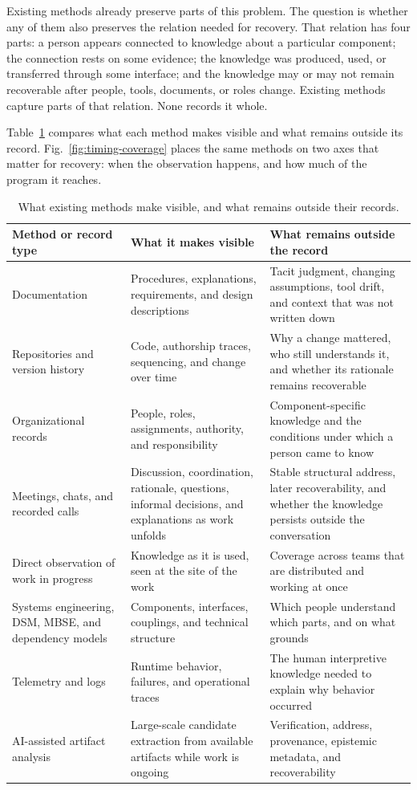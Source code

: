\documentclass[conference]{IEEEtran}
\begin{document}
Existing methods already preserve parts of this problem. The question is whether any of them also preserves the relation needed for recovery. That relation has four parts: a person appears connected to knowledge about a particular component; the connection rests on some evidence; the knowledge was produced, used, or transferred through some interface; and the knowledge may or may not remain recoverable after people, tools, documents, or roles change. Existing methods capture parts of that relation. None records it whole.

Table~\ref{tab:methods} compares what each method makes visible and what remains outside its record. Fig.~\ref{fig:timing-coverage} places the same methods on two axes that matter for recovery: when the observation happens, and how much of the program it reaches.

\begin{table}[!tb]
\caption{What existing methods make visible, and what remains outside their records.}
\label{tab:methods}
\centering
\scriptsize
\begin{tabularx}{\textwidth}{XXX}
\hline
\textbf{Method or record type} & \textbf{What it makes visible} & \textbf{What remains outside the record} \\
\hline
Documentation & Procedures, explanations, requirements, and design descriptions & Tacit judgment, changing assumptions, tool drift, and context that was not written down \\
Repositories and version history & Code, authorship traces, sequencing, and change over time & Why a change mattered, who still understands it, and whether its rationale remains recoverable \\
Organizational records & People, roles, assignments, authority, and responsibility & Component-specific knowledge and the conditions under which a person came to know \\
Meetings, chats, and recorded calls & Discussion, coordination, rationale, questions, informal decisions, and explanations as work unfolds & Stable structural address, later recoverability, and whether the knowledge persists outside the conversation \\
Direct observation of work in progress & Knowledge as it is used, seen at the site of the work & Coverage across teams that are distributed and working at once \\
Systems engineering, DSM, MBSE, and dependency models & Components, interfaces, couplings, and technical structure & Which people understand which parts, and on what grounds \\
Telemetry and logs & Runtime behavior, failures, and operational traces & The human interpretive knowledge needed to explain why behavior occurred \\
AI-assisted artifact analysis & Large-scale candidate extraction from available artifacts while work is ongoing & Verification, address, provenance, epistemic metadata, and recoverability \\
\hline
\end{tabularx}
\end{table}
\end{document}
